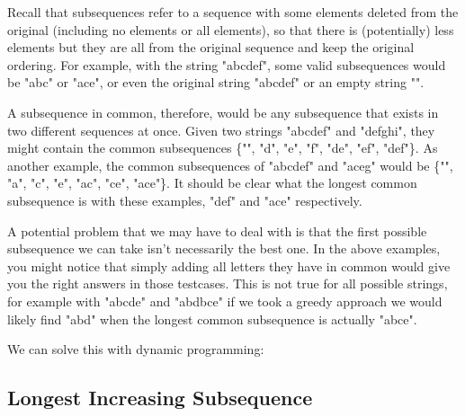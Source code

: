 Recall that subsequences refer to a sequence with some elements deleted from the original (including no elements or all elements), so that there is (potentially) less elements but they are all from the original sequence and keep the original ordering. For example, with the string "abcdef", some valid subsequences would be "abc" or "ace", or even the original string "abcdef" or an empty string "".

A subsequence in common, therefore, would be any subsequence that exists in two different sequences at once. Given two strings "abcdef" and "defghi", they might contain the common subsequences \{"", "d", "e", "f", "de", "ef", "def"\}. As another example, the common subsequences of "abcdef" and "aceg" would be \{"", "a", "c", "e", "ac", "ce", "ace"\}. It should be clear what the longest common subsequence is with these examples, "def" and "ace" respectively.

A potential problem that we may have to deal with is that the first possible subsequence we can take isn't necessarily the best one. In the above examples, you might notice that simply adding all letters they have in common would give you the right answers in those testcases. This is not true for all possible strings, for example with "abcde" and "abdbce" if we took a greedy approach we would likely find "abd" when the longest common subsequence is actually "abce".

We can solve this with dynamic programming:


\subsection{Longest Increasing Subsequence}
